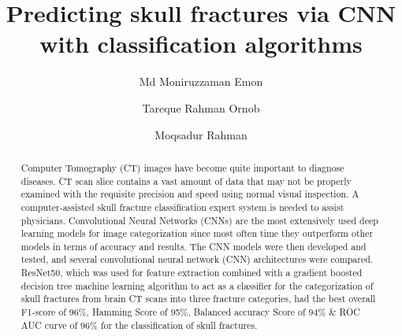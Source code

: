 \documentclass[sigconf]{acmart}
\begin{document}
\title{Predicting skull fractures via CNN with classification algorithms}

%

\author{Md Moniruzzaman Emon}


\author{ Tareque Rahman Ornob}


\author{Moqsadur Rahman}


%
\renewcommand{\shortauthors}{M. M. Emon et al.}

%
\begin{abstract}
Computer Tomography (CT) images have become quite important to diagnose diseases. CT scan slice contains a vast amount of data that may not be properly examined with the requisite precision and speed using normal visual inspection. A computer-assisted skull fracture classification expert system is needed to assist physicians. Convolutional Neural Networks (CNNs) are the most extensively used deep learning models for image categorization since most often time they outperform other models in terms of accuracy and results. The CNN models were then developed and tested, and several convolutional neural network (CNN) architectures were compared. ResNet50, which was used for feature extraction combined with a gradient boosted decision tree machine learning algorithm to act as a classifier for the categorization of skull fractures from brain CT scans into three fracture categories, had the best overall F1-score of 96\%, Hamming Score of 95\%, Balanced accuracy Score of 94\% \& ROC AUC curve of 96\% for the classification of skull fractures.

\end{abstract}
\end{document}
